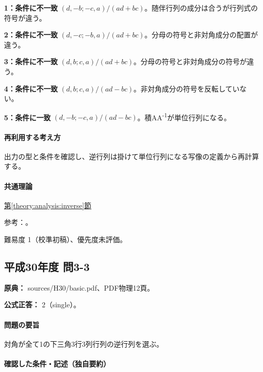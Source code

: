 \noindent\textbf{1：条件に不一致} \((d,-b;-c,a)/(ad+bc)\)。随伴行列の成分は合うが行列式の符号が違う。\par

\noindent\textbf{2：条件に不一致} \((d,-c;-b,a)/(ad+bc)\)。分母の符号と非対角成分の配置が違う。\par

\noindent\textbf{3：条件に不一致} \((d,b;c,a)/(ad+bc)\)。分母の符号と非対角成分の符号が違う。\par

\noindent\textbf{4：条件に不一致} \((d,b;c,a)/(ad-bc)\)。非対角成分の符号を反転していない。\par

\noindent\textbf{5：条件に一致} \((d,-b;-c,a)/(ad-bc)\)。積AA\textsuperscript{-1}が単位行列になる。\par

\paragraph{再利用する考え方} 出力の型と条件を確認し、逆行列は掛けて単位行列になる写像の定義から再計算する。

\paragraph{共通理論} \hyperref[theory:analysis:inverse]{第\ref*{theory:analysis:inverse}節}

\par 参考：\cite{mit_inverse2007}。

\par 難易度 1（校準初稿）、優先度未評価。

\subsection{平成30年度 問3-3}
\label{q:h30-reg-basic-3-3}

\noindent\textbf{原典：} sources/H30/basic.pdf、PDF物理12頁。

\textbf{公式正答：} 2（single）。

\paragraph{問題の要旨} 対角が全て1の下三角3行3列行列の逆行列を選ぶ。

\paragraph{確認した条件・記述（独自要約）}\mbox{}\par

